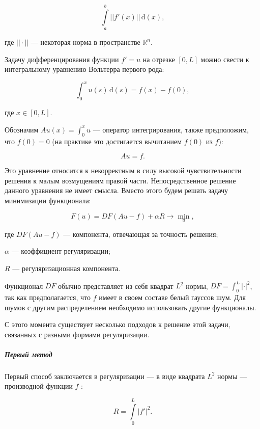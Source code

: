 \begin{equation}
\int\limits_a^b ||f'(x)||\,\mathrm{d}(x),
\end{equation}

где $||\cdot||$ --- некоторая норма в пространстве $\mathbb{R}^n$.

Задачу дифференцирования функции $f' = u$ на отрезке $[0, L]$ можно свести к интегральному уравнению Вольтерра первого рода:

\begin{equation}
\int_0^x u(s)\,\mathrm{d}(s) = f(x) - f(0),
\end{equation}

где $x \in [0, L]$.

Обозначим $A u (x) = \int_0^x u$ --- оператор интегрирования, также предположим, что $f(0) = 0$ (на практике это достигается вычитанием $f(0)$ из $f$):

\begin{equation}
A u = f.
\end{equation}

Это уравнение относится к некорректным в силу высокой чувствительности решения к малым возмущениям правой части. Непосредственное решение данного уравнения не имеет смысла. Вместо этого будем решать задачу минимизации функционала:

\begin{equation}
F(u) = DF(A u - f) + \alpha R \longrightarrow \min_u,
\end{equation}

где $DF(A u - f)$ --- компонента, отвечающая за точность решения;
\par $\alpha$ --- коэффициент регуляризации;
\par $R$ --- регуляризационная компонента.

Функционал $DF$ обычно представляет из себя квадрат $L^2$ нормы, $DF = \int_0^L |\cdot|^2$, так как предполагается, что $f$ имеет в своем составе белый гауссов шум. Для шумов с другим распределением необходимо использовать другие функционалы.

С этого момента существует несколько подходов к решение этой задачи, связанных с разными формами регуляризации.

\subparagraph{Первый метод}

Первый способ заключается в регуляризации --- в виде квадрата $L^2$ нормы --- производной функции $f$ \cite{fast_tvr}:

\begin{equation}
R = \int\limits_0^L |f'|^2.
\end{equation}

